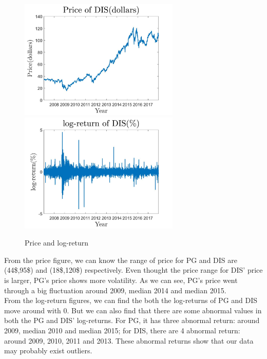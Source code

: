 \documentclass[12pt,letterpaper]{article}
\begin{document}
\begin{enumerate}[label=\textbf{(\Alph*)}]
\begin{figure}[H]
{\begin{minipage}[r]{1\linewidth}
           \includegraphics[width=3in]{figures/p2_ex1_e1_DIS.jpg}
            \includegraphics[width=3in]{figures/p2_ex1_e2_DIS.jpg}
            \end{minipage}
            }
            \centering
            \caption{Price and log-return}
\end{figure}

From the price figure, we can know the range of price for PG and DIS are (44\$,95\$) and (18\$,120\$) respectively. Even thought the price range for DIS' price is larger, PG's price shows more volatility. As we can see, PG's price went through a big fluctuation around 2009, median 2014 and median 2015.  
\\

From the log-return figures, we can find the both the log-returns of PG and DIS move around with 0. But we can also find that there are some abnormal values in both the PG and DIS' log-returns. For PG, it has three abnormal return: around 2009, median 2010 and median 2015; for DIS, there are 4 abnormal return: around 2009, 2010, 2011 and 2013. These abnormal returns show that our data may probably exist outliers. 
\\


\end{enumerate}
\end{document}
